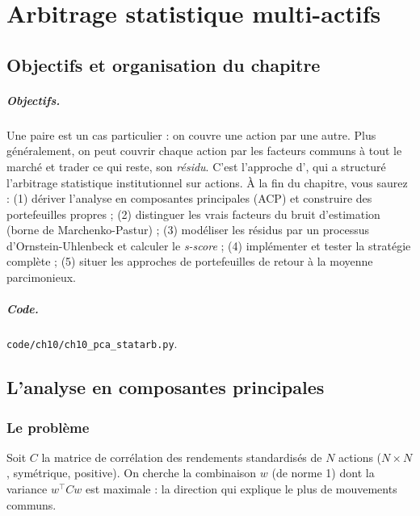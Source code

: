 \chapter{Arbitrage statistique multi-actifs}
\label{ch:10}

\section{Objectifs et organisation du chapitre}

\paragraph{Objectifs.} Une paire est un cas particulier : on couvre une action par une autre. Plus généralement, on peut couvrir chaque action par les facteurs communs à tout le marché et trader ce qui reste, son \emph{résidu}. C'est l'approche d'\citet{avellaneda2010}, qui a structuré l'arbitrage statistique institutionnel sur actions. À la fin du chapitre, vous saurez : (1) dériver l'analyse en composantes principales (ACP) et construire des portefeuilles propres ; (2) distinguer les vrais facteurs du bruit d'estimation (borne de Marchenko-Pastur) ; (3) modéliser les résidus par un processus d'Ornstein-Uhlenbeck et calculer le \emph{s-score} ; (4) implémenter et tester la stratégie complète ; (5) situer les approches de portefeuilles de retour à la moyenne parcimonieux.

\paragraph{Code.} \texttt{code/ch10/ch10\_pca\_statarb.py}.

\section{L'analyse en composantes principales}

\subsection{Le problème}

Soit $C$ la matrice de corrélation des rendements standardisés de $N$ actions ($N\times N$, symétrique, positive). On cherche la combinaison $w$ (de norme 1) dont la variance $w^\top Cw$ est maximale : la direction qui explique le plus de mouvements communs.

